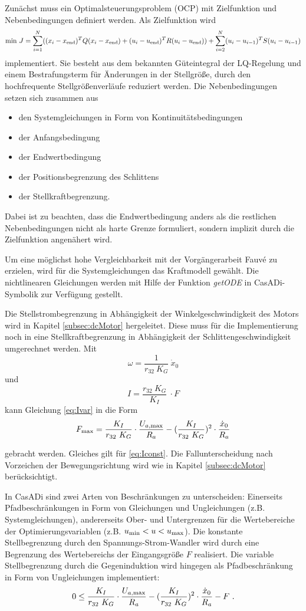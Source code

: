 Zunächst muss ein Optimalsteuerungsproblem (OCP) mit Zielfunktion und Nebenbedingungen definiert werden. Als Zielfunktion wird 
	\[
	\mathrm{min} \ J = \sum_{i=1}^N ((x_i-x_{\mathrm{end}})^T Q (x_i-x_{\mathrm{end}}) + (u_i-u_{\mathrm{end}})^T R (u_i-u_{\mathrm{end}})) + 
	\sum_{i=2}^N (u_i-u_{i-1})^T S (u_i-u_{i-1})
\]
implementiert. Sie besteht aus dem bekannten Güteintegral der LQ-Regelung und einem Bestrafungsterm für Änderungen in der Stellgröße, durch den hochfrequente Stellgrößenverläufe reduziert werden. Die Nebenbedingungen setzen sich zusammen aus
\begin{itemize}
	\item den Systemgleichungen in Form von Kontinuitätsbedingungen 
	\item der Anfangsbedingung
	\item der Endwertbedingung
	\item der Positionsbegrenzung des Schlittens
	\item der Stellkraftbegrenzung.
\end{itemize}

Dabei ist zu beachten, dass die Endwertbedingung anders als die restlichen Nebenbedingungen nicht als harte Grenze formuliert, sondern implizit durch die Zielfunktion angenähert wird. 

Um eine möglichst hohe Vergleichbarkeit mit der Vorgängerarbeit Fauvé \cite{fauve} zu erzielen, wird für die Systemgleichungen das Kraftmodell gewählt. Die nichtlinearen Gleichungen werden mit Hilfe der Funktion \textit{getODE} in CasADi-Symbolik zur Verfügung gestellt.

Die Stellstrombegrenzung in Abhängigkeit der Winkelgeschwindigkeit des Motors wird in Kapitel \ref{subsec:dcMotor} hergeleitet. Diese muss für die Implementierung noch in eine Stellkraftbegrenzung in Abhängigkeit der Schlittengeschwindigkeit umgerechnet werden.
Mit 
	\[
	\omega = \frac{1}{r_{32}\ K_G} \ \dot{x}_0 
\]
und 
	\[
	I = \frac{r_{32}\ K_G}{K_I} \ \cdot F
\]
kann Gleichung \eqref{eq:Ivar} in die Form
	\[
	F_{\mathrm{max}} = \frac{K_I}{r_{32}\ K_G} \cdot \frac{U_{a\mathrm{,max}}}{R_a} - (\frac{K_I}{r_{32}\ K_G})^2 \cdot \frac{\dot{x}_0}{R_a}
\]

gebracht werden. Gleiches gilt für \eqref{eq:Iconst}. Die Fallunterscheidung nach Vorzeichen der Bewegungsrichtung wird wie in Kapitel \ref{subsec:dcMotor} berücksichtigt. 

In CasADi sind zwei Arten von Beschränkungen zu unterscheiden: Einerseits Pfadbeschränkungen in Form von Gleichungen und Ungleichungen (z.B. Systemgleichungen), andererseits Ober- und Untergrenzen für die Wertebereiche der Optimierungsvariablen (z.B. $u_{\mathrm{min}}<u<u_{\mathrm{max}}$). Die konstante Stellbegrenzung durch den Spannungs-Strom-Wandler wird durch eine Begrenzung des Wertebereichs der Eingangsgröße $F$ realisiert. Die variable Stellbegrenzung durch die Gegeninduktion wird hingegen als Pfadbeschränkung in Form von Ungleichungen implementiert:
\[
	 0 \leq \frac{K_I}{r_{32}\ K_G} \cdot \frac{U_{a\mathrm{,max}}}{R_a} - (\frac{K_I}{r_{32}\ K_G})^2 \cdot \frac{\dot{x}_0}{R_a} - F \ .
\]

